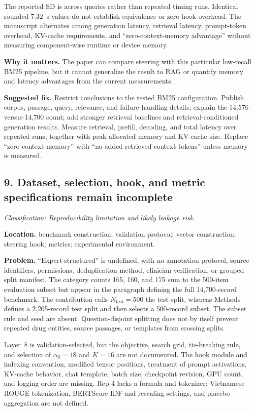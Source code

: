 \documentclass[11pt]{article}
\newcommand{\findinglabel}[1]{\textbf{#1}}
\newcommand{\classification}[1]{\textit{Classification: #1.}}
\begin{document}
The reported SD is across queries rather than repeated timing runs.  Identical rounded 7.32~s values do not establish equivalence or zero hook overhead.  The manuscript alternates among generation latency, retrieval latency, prompt-token overhead, KV-cache requirements, and ``zero-context-memory advantage'' without measuring component-wise runtime or device memory.

\findinglabel{Why it matters.} The paper can compare steering with this particular low-recall BM25 pipeline, but it cannot generalize the result to RAG or quantify memory and latency advantages from the current measurements.

\findinglabel{Suggested fix.} Restrict conclusions to the tested BM25 configuration.  Publish corpus, passage, query, relevance, and failure-handling details; explain the 14,576-versus-14,700 count; add stronger retrieval baselines and retrieval-conditioned generation results.  Measure retrieval, prefill, decoding, and total latency over repeated runs, together with peak allocated memory and KV-cache size.  Replace ``zero-context-memory'' with ``no added retrieved-context tokens'' unless memory is measured.

\subsection*{9. Dataset, selection, hook, and metric specifications remain incomplete}

\classification{Reproducibility limitation and likely leakage risk}

\findinglabel{Location.} benchmark construction; validation protocol; vector construction; steering hook; metrics; experimental environment.

\findinglabel{Problem.} ``Expert-structured'' is undefined, with no annotation protocol, source identifiers, permissions, deduplication method, clinician verification, or grouped split manifest.  The category counts 165, 160, and 175 sum to the 500-item evaluation subset but appear in the paragraph defining the full 14,700-record benchmark.  The contribution calls $N_{\text{test}}=500$ the test split, whereas Methods defines a 2,205-record test split and then selects a 500-record subset.  The subset rule and seed are absent.  Question-disjoint splitting does not by itself prevent repeated drug entities, source passages, or templates from crossing splits.

Layer~8 is validation-selected, but the objective, search grid, tie-breaking rule, and selection of $\alpha_0=18$ and $K=16$ are not documented.  The hook module and indexing convention, modified tensor positions, treatment of prompt activations, KV-cache behavior, chat template, batch size, checkpoint revision, GPU count, and logging order are missing.  Rep-4 lacks a formula and tokenizer; Vietnamese ROUGE tokenization, BERTScore IDF and rescaling settings, and placebo aggregation are not defined.
\end{document}
